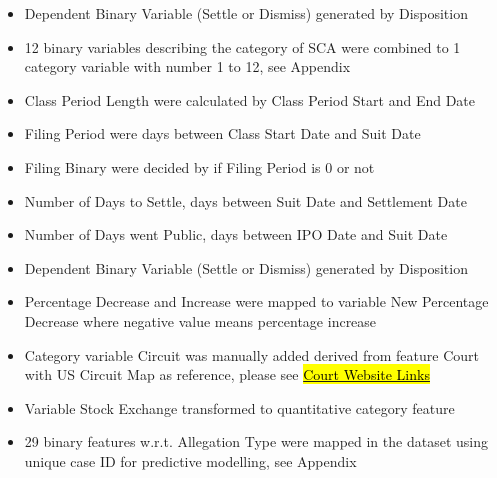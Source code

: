  \begin{itemize}
     \item Dependent Binary Variable (Settle or Dismiss) generated by Disposition 
     \item 12 binary variables describing the category of SCA were combined to 1 category variable with number 1 to 12, see Appendix
     \item Class Period Length were calculated by Class Period Start and End Date
     \item Filing Period were days between Class Start Date and Suit Date
     \item Filing Binary were decided by if Filing Period is 0 or not 
     \item Number of Days to Settle, days between Suit Date and Settlement Date
     \item Number of Days went Public, days between IPO Date and Suit Date
     \item Dependent Binary Variable (Settle or Dismiss) generated by Disposition 
     \item Percentage Decrease and Increase were mapped to variable New Percentage Decrease where negative value means percentage increase
     \item Category variable Circuit was manually added derived from feature Court with US Circuit Map as reference, please see \href{http://www.uscourts.gov/about-federal-courts/federal-courts-public/court-website-links}{\hl{Court Website Links}}  
     \item Variable Stock Exchange transformed to quantitative category feature
     \item 29 binary features w.r.t. Allegation Type were mapped in the dataset using unique case ID for predictive modelling, see Appendix
  \end{itemize}
